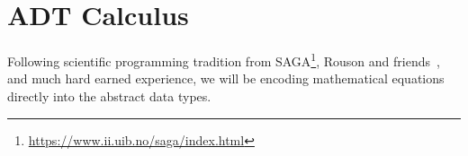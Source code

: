 \section{ADT Calculus}

Following scientific programming tradition from SAGA\footnote{\url{https://www.ii.uib.no/saga/index.html}},
Rouson and friends~\cite{rouson2011scientific,rouson2008grid}, and much
hard earned experience, we will be encoding mathematical equations
directly into the abstract data types.

%
